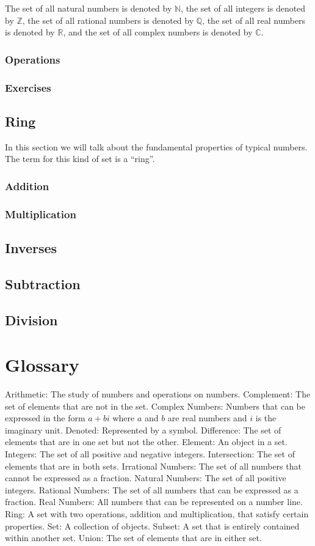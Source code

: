 The set of all natural numbers is denoted by $\mathbb{N}$, the set of all integers is denoted by
$\mathbb{Z}$, the set of all rational numbers is denoted by $\mathbb{Q}$,
the set of all real numbers is denoted by $\mathbb{R}$,
and the set of all complex numbers is denoted by $\mathbb{C}$.

\subsection{Operations}

\subsection{Exercises}

\section{Ring}
In this section we will talk about the fundamental properties of typical numbers.
The term for this kind of set is a ``ring''.
\subsection{Addition}
\subsection{Multiplication}
\section{Inverses}
\section{Subtraction}
\section{Division}



\chapter{Glossary}
Arithmetic: The study of numbers and operations on numbers.
Complement: The set of elements that are not in the set.
Complex Numbers: Numbers that can be expressed in the form $a + bi$ where $a$ and $b$ are real numbers and $i$ is the imaginary unit.
Denoted: Represented by a symbol.
Difference: The set of elements that are in one set but not the other.
Element: An object in a set.
Integers: The set of all positive and negative integers.
Intersection: The set of elements that are in both sets.
Irrational Numbers: The set of all numbers that cannot be expressed as a fraction.
Natural Numbers: The set of all positive integers.
Rational Numbers: The set of all numbers that can be expressed as a fraction.
Real Numbers: All numbers that can be represented on a number line.
Ring: A set with two operations, addition and multiplication, that satisfy certain properties.
Set: A collection of objects.
Subset: A set that is entirely contained within another set.
Union: The set of elements that are in either set.